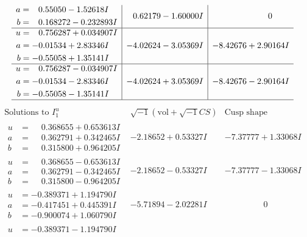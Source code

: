 \documentclass[1p]{elsarticle_modified}
\theoremstyle{definition}
\newcommand{\I}{\sqrt{-1}}
\begin{document}
$$\begin{array}{c|c|c}
\begin{aligned}
a &= \phantom{-}0.55050 - 1.52618 I \\
b &= \phantom{-}0.168272 - 0.232893 I\end{aligned}
 & \phantom{-}0.62179 - 1.60000 I & \phantom{-0.000000 } 0 \\ \hline\begin{aligned}
u &= \phantom{-}0.756287 + 0.034907 I \\
a &= -0.01534 + 2.83346 I \\
b &= -0.55058 + 1.35141 I\end{aligned}
 & -4.02624 - 3.05369 I & -8.42676 + 2.90164 I \\ \hline\begin{aligned}
u &= \phantom{-}0.756287 - 0.034907 I \\
a &= -0.01534 - 2.83346 I \\
b &= -0.55058 - 1.35141 I\end{aligned}
 & -4.02624 + 3.05369 I & -8.42676 - 2.90164 I\\
 \hline 
 \end{array}$$\newpage$$\begin{array}{c|c|c}  
\text{Solutions to }I^u_{1}& \I (\text{vol} + \sqrt{-1}CS) & \text{Cusp shape}\\
 \hline 
\begin{aligned}
u &= \phantom{-}0.368655 + 0.653613 I \\
a &= \phantom{-}0.362791 + 0.342465 I \\
b &= \phantom{-}0.315800 + 0.964205 I\end{aligned}
 & -2.18652 + 0.53327 I & -7.37777 + 1.33068 I \\ \hline\begin{aligned}
u &= \phantom{-}0.368655 - 0.653613 I \\
a &= \phantom{-}0.362791 - 0.342465 I \\
b &= \phantom{-}0.315800 - 0.964205 I\end{aligned}
 & -2.18652 - 0.53327 I & -7.37777 - 1.33068 I \\ \hline\begin{aligned}
u &= -0.389371 + 1.194790 I \\
a &= -0.417451 + 0.445391 I \\
b &= -0.900074 + 1.060790 I\end{aligned}
 & -5.71894 - 2.02281 I & \phantom{-0.000000 } 0 \\ \hline\begin{aligned}
u &= -0.389371 - 1.194790 I \\

\end{aligned}
\end{array}$$
\end{document}
